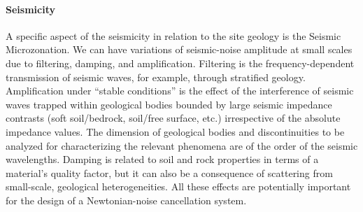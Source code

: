 \paragraph{Seismicity} A specific aspect of the seismicity in relation to the site geology is the Seismic Microzonation. We can have variations of seismic-noise amplitude at small scales due to filtering, damping, and amplification. Filtering is the frequency-dependent transmission of seismic waves, for example, through stratified geology. Amplification under “stable conditions” is the effect of the interference of seismic waves trapped within geological bodies bounded by large seismic impedance contrasts (soft soil/bedrock, soil/free surface, etc.) irrespective of the absolute impedance values. The dimension of geological bodies and discontinuities to be analyzed for characterizing the relevant phenomena are of the order of the seismic wavelengths. Damping is related to soil and rock properties in terms of a material’s quality factor, but it can also be a consequence of scattering from small-scale, geological heterogeneities. All these effects are potentially important for the design of a Newtonian-noise cancellation system. 

